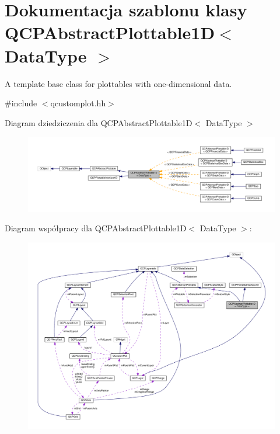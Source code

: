 \hypertarget{class_q_c_p_abstract_plottable1_d}{}\section{Dokumentacja szablonu klasy Q\+C\+P\+Abstract\+Plottable1D$<$ Data\+Type $>$}
\label{class_q_c_p_abstract_plottable1_d}


A template base class for plottables with one-\/dimensional data.  




{\ttfamily \#include $<$qcustomplot.\+hh$>$}



Diagram dziedziczenia dla Q\+C\+P\+Abstract\+Plottable1D$<$ Data\+Type $>$\nopagebreak
\begin{figure}[H]
\begin{center}
\leavevmode
\includegraphics[width=350pt]{class_q_c_p_abstract_plottable1_d__inherit__graph}
\end{center}
\end{figure}


Diagram współpracy dla Q\+C\+P\+Abstract\+Plottable1D$<$ Data\+Type $>$\+:\nopagebreak
\begin{figure}[H]
\begin{center}
\leavevmode
\includegraphics[width=350pt]{class_q_c_p_abstract_plottable1_d__coll__graph}
\end{center}
\end{figure}
